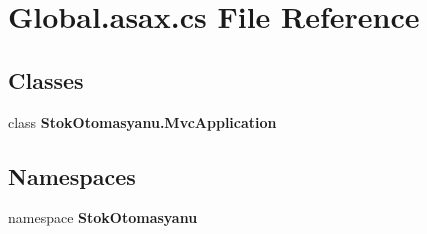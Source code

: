 \section{Global.\+asax.\+cs File Reference}
\label{_global_8asax_8cs}
\subsection*{Classes}
\begin{DoxyCompactItemize}
\item 
class \textbf{ Stok\+Otomasyanu.\+Mvc\+Application}
\end{DoxyCompactItemize}
\subsection*{Namespaces}
\begin{DoxyCompactItemize}
\item 
namespace \textbf{ Stok\+Otomasyanu}
\end{DoxyCompactItemize}
